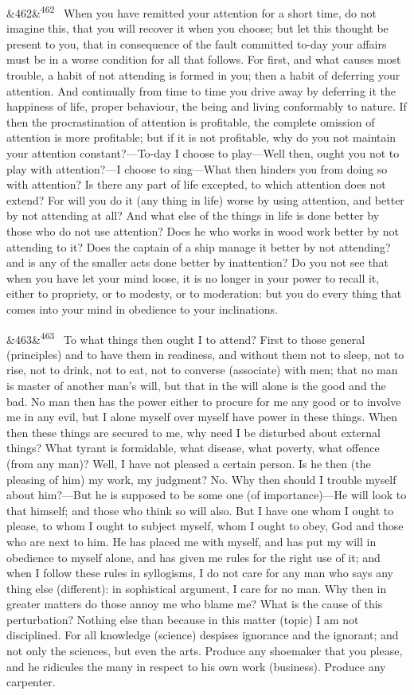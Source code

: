 \documentclass[12pt]{article}
\newcommand{\para}[1][]{\par\noindent\ifx&#1&\else\textsuperscript{\footnotesize #1}~\fi}
\begin{document}
\para[462] When you have remitted your attention for a short time, do not imagine this, that you will recover it when you choose; but let this thought be present to you, that in consequence of the fault committed to-day your affairs must be in a worse condition for all that follows. For first, and what causes most trouble, a habit of not attending is formed in you; then a habit of deferring your attention. And continually from time to time you drive away by deferring it the happiness of life, proper behaviour, the being and living conformably to nature. If then the procrastination of attention is profitable, the complete omission of attention is more profitable; but if it is not profitable, why do you not maintain your attention constant?—To-day I choose to play—Well then, ought you not to play with attention?—I choose to sing—What then hinders you from doing so with attention? Is there any part of life excepted, to which attention does not extend? For will you do it (any thing in life) worse by using attention, and better by not attending at all? And what else of the things in life is done better by those who do not use attention? Does he who works in wood work better by not attending to it? Does the captain of a ship manage it better by not attending? and is any of the smaller acts done better by inattention? Do you not see that when you have let your mind loose, it is no longer in your power to recall it, either to propriety, or to modesty, or to moderation: but you do every thing that comes into your mind in obedience to your inclinations.

\para[463] To what things then ought I to attend? First to those general (principles) and to have them in readiness, and without them not to sleep, not to rise, not to drink, not to eat, not to converse (associate) with men; that no man is master of another man's will, but that in the will alone is the good and the bad. No man then has the power either to procure for me any good or to involve me in any evil, but I alone myself over myself have power in these things. When then these things are secured to me, why need I be disturbed about external things? What tyrant is formidable, what disease, what poverty, what offence (from any man)? Well, I have not pleased a certain person. Is he then (the pleasing of him) my work, my judgment? No. Why then should I trouble myself about him?—But he is supposed to be some one (of importance)—He will look to that himself; and those who think so will also. But I have one whom I ought to please, to whom I ought to subject myself, whom I ought to obey, God and those who are next to him. He has placed me with myself, and has put my will in obedience to myself alone, and has given me rules for the right use of it; and when I follow these rules in syllogisms, I do not care for any man who says any thing else (different): in sophistical argument, I care for no man. Why then in greater matters do those annoy me who blame me? What is the cause of this perturbation? Nothing else than because in this matter (topic) I am not disciplined. For all knowledge (science) despises ignorance and the ignorant; and not only the sciences, but even the arts. Produce any shoemaker that you please, and he ridicules the many in respect to his own work (business). Produce any carpenter.
\end{document}
